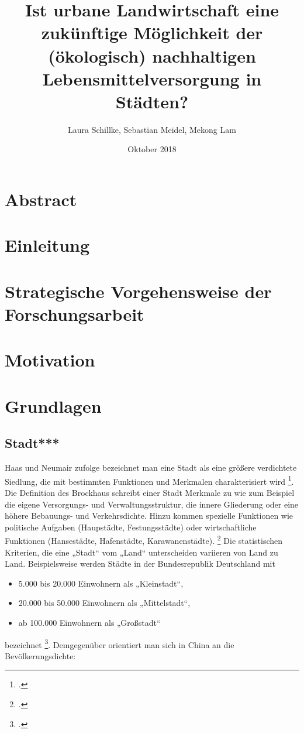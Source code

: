 \documentclass{scrartcl}
\title{Ist urbane Landwirtschaft eine zukünftige Möglichkeit der (ökologisch) nachhaltigen Lebensmittelversorgung in Städten?}
\author{Laura Schillke, Sebastian Meidel, Mekong Lam }
\date{Oktober 2018}
\begin{document}
\maketitle


\newpage

\setcounter{tocdepth}{2}
\tableofcontents 



\newpage

\section{Abstract}

\section{Einleitung}

\section{Strategische Vorgehensweise der Forschungsarbeit}

\section{Motivation}

\section{Grundlagen}

\subsection{Stadt***}

Haas und Neumair zufolge bezeichnet man eine Stadt als eine größere verdichtete Siedlung, die mit bestimmten Funktionen und Merkmalen charakterisiert wird \footcite{HaasDefinitionWirtschaftslexikon}. Die Definition des Brockhaus schreibt einer Stadt Merkmale zu wie zum Beispiel die eigene Versorgungs- und Verwaltungsstruktur, die innere Gliederung oder eine höhere Bebauungs- und Verkehrsdichte. Hinzu kommen spezielle Funktionen wie politische Aufgaben (Haupstädte, Festungsstädte) oder wirtschaftliche Funktionen (Hansestädte, Hafenstädte, Karawanenstädte). \footcite{BrockhausStadt} Die statistischen Kriterien, die eine „Stadt“ vom „Land“ unterscheiden variieren von Land zu Land. Beispielsweise werden Städte in der Bundesrepublik Deutschland mit 
\begin{itemize}
\item 5.000 bis 20.000 Einwohnern als „Kleinstadt“,
\item 20.000 bis 50.000 Einwohnern als „Mittelstadt“,
\item ab 100.000 Einwohnern als „Großstadt“ 
\end{itemize}
bezeichnet \footcite{Institutinternationaldestatistique1887BulletinStatistique}. Demgegenüber orientiert man sich in China an die Bevölkerungsdichte: 
\end{document}
